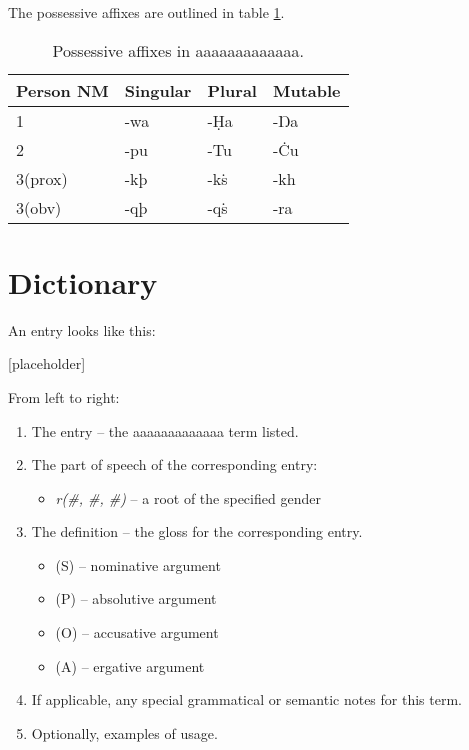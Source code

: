 \documentclass{book}
\newcommand{\lname}{aaaaaaaaaaaaa}
\begin{document}
The possessive affixes are outlined in table \ref{table:declension2}.

\begin{table}[h]
  \caption{Possessive affixes in \lname.}
  \label{table:declension2}
  \centering
  \begin{tabular}{l|lll}
    Person \bs{} NM & Singular & Plural & Mutable \\
    \hline
    1 & -wa & -Ḥa & -Ŋa \\
    2 & -pu & -Tu & -Ċu \\
    3(prox) & -kþ & -kṡ & -kh \\
    3(obv) & -qþ & -qṡ & -ra \\
  \end{tabular}
\end{table}

\appendix

\chapter{Dictionary}

An entry looks like this:

{}[placeholder]

From left to right:

\begin{enumerate}
    \item The entry -- the \lname{} term listed.
    \item The part of speech of the corresponding entry:
    \begin{itemize}
        \item \textit{r(\#, \#, \#)} -- a root of the specified gender
    \end{itemize}
    \item The definition -- the gloss for the corresponding entry.
    \begin{itemize}
        \item (S) -- nominative argument
        \item (P) -- absolutive argument
        \item (O) -- accusative argument
        \item (A) -- ergative argument
    \end{itemize}
    \item If applicable, any special grammatical or semantic notes for this term.
    \item Optionally, examples of usage.
\end{enumerate}

\begin{multicols}{2}
    
\end{multicols}
\end{document}
